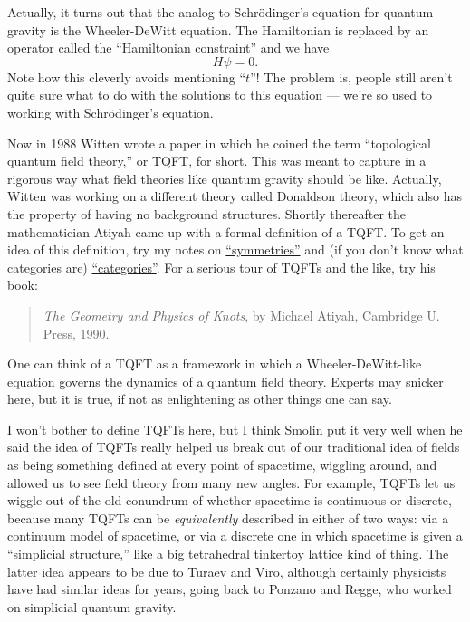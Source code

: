 \documentclass[12pt]{article}
\begin{document}
Actually, it turns out that the analog to Schr\"odinger's equation for
quantum gravity is the Wheeler-DeWitt equation. The Hamiltonian is
replaced by an operator called the ``Hamiltonian constraint'' and we
have \[H\psi = 0.\] Note how this cleverly avoids mentioning ``\(t\)''!
The problem is, people still aren't quite sure what to do with the
solutions to this equation --- we're so used to working with
Schr\"odinger's equation.

Now in 1988 Witten wrote a paper in which he coined the term
``topological quantum field theory,'' or TQFT, for short. This was meant
to capture in a rigorous way what field theories like quantum gravity
should be like. Actually, Witten was working on a different theory
called Donaldson theory, which also has the property of having no
background structures. Shortly thereafter the mathematician Atiyah came
up with a formal definition of a TQFT. To get an idea of this
definition, try my notes on
\href{http://math.ucr.edu/home/baez/symmetries.html}{``symmetries''} and
(if you don't know what categories are)
\href{http://math.ucr.edu/home/baez/categories.html}{``categories''}.
For a serious tour of TQFTs and the like, try his book:

\begin{quote}
\emph{The Geometry and Physics of Knots}, by Michael Atiyah, Cambridge
U. Press, 1990.
\end{quote}

One can think of a TQFT as a framework in which a Wheeler-DeWitt-like
equation governs the dynamics of a quantum field theory. Experts may
snicker here, but it is true, if not as enlightening as other things one
can say.

I won't bother to define TQFTs here, but I think Smolin put it very well
when he said the idea of TQFTs really helped us break out of our
traditional idea of fields as being something defined at every point of
spacetime, wiggling around, and allowed us to see field theory from many
new angles. For example, TQFTs let us wiggle out of the old conundrum of
whether spacetime is continuous or discrete, because many TQFTs can be
\emph{equivalently} described in either of two ways: via a continuum
model of spacetime, or via a discrete one in which spacetime is given a
``simplicial structure,'' like a big tetrahedral tinkertoy lattice kind
of thing. The latter idea appears to be due to Turaev and Viro, although
certainly physicists have had similar ideas for years, going back to
Ponzano and Regge, who worked on simplicial quantum gravity.
\end{document}

